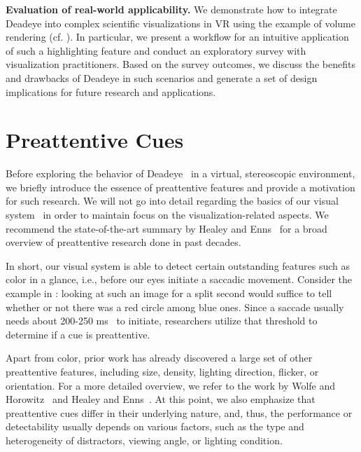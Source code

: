 \documentclass[journal]{vgtc}                %
\begin{document}
\textbf{Evaluation of real-world applicability.} We demonstrate how to integrate Deadeye into complex scientific visualizations in VR using the example of volume rendering (cf. ). In particular, we present a workflow for an intuitive application of such a highlighting feature and conduct an exploratory survey with visualization practitioners. Based on the survey outcomes, we discuss the benefits and drawbacks of Deadeye in such scenarios and generate a set of design implications for future research and applications.




\section{Preattentive Cues}

Before exploring the behavior of Deadeye~\cite{krekhov2019deadeye} in a virtual, stereoscopic environment, we briefly introduce the essence of preattentive features and provide a motivation for such research. We will not go into detail regarding the basics of our visual system~\cite{NOTON1971929,itti2001computational,yarbus1967eye} in order to maintain focus on the visualization-related aspects. We recommend the state-of-the-art summary by Healey and Enns~\cite{Healey:2012:AVM:2225054.2225226} for a broad overview of preattentive research done in past decades.

In short, our visual system is able to detect certain outstanding features such as color in a glance, i.e., before our eyes initiate a saccadic movement. Consider the example in : looking at such an image for a split second would suffice to tell whether or not there was a red circle among blue ones. Since a saccade usually needs about 200-250 ms~\cite{Healey:2012:AVM:2225054.2225226} to initiate, researchers utilize that threshold to determine if a cue is preattentive. 

Apart from color, prior work has already discovered a large set of other preattentive features, including size, density, lighting direction, flicker, or orientation. For a more detailed overview, we refer to the work by Wolfe and Horowitz~\cite{wolfe2017five} and Healey and Enns~\cite{Healey:2012:AVM:2225054.2225226}. At this point, we also emphasize that preattentive cues differ in their underlying nature, and, thus, the performance or detectability usually depends on various factors, such as the type and heterogeneity of distractors, viewing angle, or lighting condition.
\end{document}
